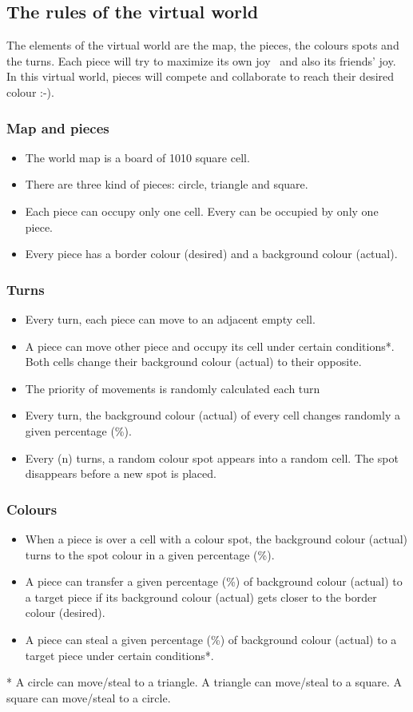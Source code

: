 \documentclass[a4paper]{article}
\newcommand\liststyleLi{%
\renewcommand\labelitemi{{\textbullet}}
\renewcommand\labelitemii{{\textbullet}}
\renewcommand\labelitemiii{{\textbullet}}
\renewcommand\labelitemiv{{\textbullet}}
}
\newcommand\liststyleLxii{%
\renewcommand\labelitemi{{\textbullet}}
\renewcommand\labelitemii{{\textbullet}}
\renewcommand\labelitemiii{{\textbullet}}
\renewcommand\labelitemiv{{\textbullet}}
}
\newcommand\liststyleLxiii{%
\renewcommand\labelitemi{{\textbullet}}
\renewcommand\labelitemii{{\textbullet}}
\renewcommand\labelitemiii{{\textbullet}}
\renewcommand\labelitemiv{{\textbullet}}
}
\begin{document}
\subsection{The rules of the virtual world}
The elements of the virtual world are the map, the pieces, the colours
spots and the turns. Each piece will try to maximize its own joy ~and
also its friends{\textquoteright} joy. In this virtual world, pieces
will compete and collaborate to reach their desired colour :-).

\subsubsection{Map and pieces}
\liststyleLi
\begin{itemize}
\item The world map is a board of 10{\texttimes}10 square cell. 
\item There are three kind of pieces: circle, triangle and square. 
\item Each piece can occupy only one cell. Every can be occupied by only
one piece. 
\item Every piece has a border colour (desired) and a background colour
(actual). 
\end{itemize}
\subsubsection{Turns}
\liststyleLxii
\begin{itemize}
\item Every turn, each piece can move to an adjacent empty cell. 
\item A piece can move other piece and occupy its cell under certain
conditions*. Both cells change their background colour (actual) to
their opposite. 
\item The priority of movements is randomly calculated each turn 
\item Every turn, the background colour (actual) of every cell changes
randomly a given percentage (\%). 
\item Every (n) turns, a random colour spot appears into a random cell.
The spot disappears before a new spot is placed. 
\end{itemize}
\subsubsection{Colours}
\liststyleLxiii
\begin{itemize}
\item When a piece is over a cell with a colour spot, the background
colour (actual) turns to the spot colour in a given percentage (\%). 
\item A piece can transfer a given percentage (\%) of background colour
(actual) to a target piece if its background colour (actual) gets
closer to the border colour (desired). 
\item A piece can steal a given percentage (\%) of background colour
(actual) to a target piece under certain conditions*. 
\end{itemize}
* A circle can move/steal to a triangle. A triangle can move/steal to a
square. A square can move/steal to a circle.
\end{document}

